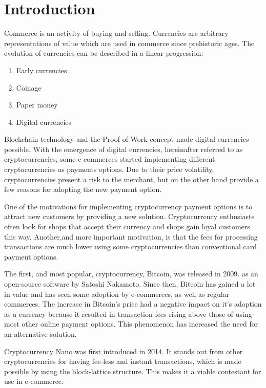 \documentclass{ferseminar}
\begin{document}
\stvoripredstranice
\section{Introduction}
Commerce is an activity of buying and selling. Currencies are arbitrary representations of value which are used in commerce since prehistoric ages. The evolution of currencies can be described in a linear progression:

\begin{enumerate}
	\item Early currencies
	\item Coinage
	\item Paper money
	\item Digital currencies
\end{enumerate}

Blockchain technology and the Proof-of-Work concept made digital currencies possible. With the emergence of digital currencies, hereinafter referred to as cryptocurrencies, some e-commerces started implementing different cryptocurrencies as payments options. Due to their price volatility, cryptocurrencies present a risk to the merchant, but on the other hand provide a few reasons for adopting the new payment option.

One of the motivations for implementing cryptocurrency payment options is to attract new customers by providing a new solution. Cryptocurrency enthusiasts often look for shops that accept their currency and shops gain loyal customers this way. Another,and more important motivation, is that the fees for processing transactions are much lower using some cryptocurrencies than conventional card payment options.

The first, and most popular, cryptocurrency, Bitcoin, was released in 2009. as an open-source software by Satoshi Nakamoto. Since then, Bitcoin has gained a lot in value and has seen some adoption by e-commerces, as well as regular commerces. The increase in Bitcoin's price had a negative impact on it's adoption as a currency because it resulted in transaction fees rising above those of using most other online payment options. This phenomenon has increased the need for an alternative solution.

Cryptocurrency Nano was first introduced in 2014. It stands out from other cryptocurrencies for having fee-less and instant transactions, which is made possible by using the block-lattice structure. This makes it a viable contestant for use in e-commerce.
\end{document}
